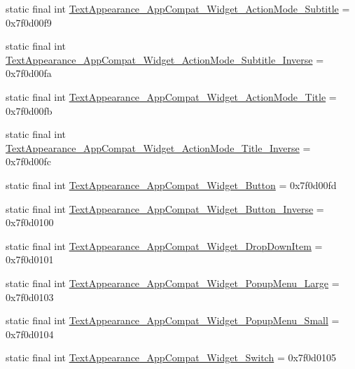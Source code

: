 \begin{DoxyCompactItemize}
static final int \mbox{\hyperlink{classcom_1_1google_1_1android_1_1gms_1_1R_1_1style_a1d243a24edebe60f77d75158e115153e}{Text\+Appearance\+\_\+\+App\+Compat\+\_\+\+Widget\+\_\+\+Action\+Mode\+\_\+\+Subtitle}} = 0x7f0d00f9
\item 
static final int \mbox{\hyperlink{classcom_1_1google_1_1android_1_1gms_1_1R_1_1style_ad203b7467b96ac78c8c6b61f2c54f6b7}{Text\+Appearance\+\_\+\+App\+Compat\+\_\+\+Widget\+\_\+\+Action\+Mode\+\_\+\+Subtitle\+\_\+\+Inverse}} = 0x7f0d00fa
\item 
static final int \mbox{\hyperlink{classcom_1_1google_1_1android_1_1gms_1_1R_1_1style_ad1125fe97c001a2f845969217abfa298}{Text\+Appearance\+\_\+\+App\+Compat\+\_\+\+Widget\+\_\+\+Action\+Mode\+\_\+\+Title}} = 0x7f0d00fb
\item 
static final int \mbox{\hyperlink{classcom_1_1google_1_1android_1_1gms_1_1R_1_1style_ad760836702bd5dc1630f2955991bf8eb}{Text\+Appearance\+\_\+\+App\+Compat\+\_\+\+Widget\+\_\+\+Action\+Mode\+\_\+\+Title\+\_\+\+Inverse}} = 0x7f0d00fc
\item 
static final int \mbox{\hyperlink{classcom_1_1google_1_1android_1_1gms_1_1R_1_1style_a27ea640eceee4202136b44b41c4dd060}{Text\+Appearance\+\_\+\+App\+Compat\+\_\+\+Widget\+\_\+\+Button}} = 0x7f0d00fd
\item 
static final int \mbox{\hyperlink{classcom_1_1google_1_1android_1_1gms_1_1R_1_1style_a10bcb1b8ccbdc284a51f921b1c25b1a8}{Text\+Appearance\+\_\+\+App\+Compat\+\_\+\+Widget\+\_\+\+Button\+\_\+\+Inverse}} = 0x7f0d0100
\item 
static final int \mbox{\hyperlink{classcom_1_1google_1_1android_1_1gms_1_1R_1_1style_a76db62b81a65e24f5f366c27a2a92e75}{Text\+Appearance\+\_\+\+App\+Compat\+\_\+\+Widget\+\_\+\+Drop\+Down\+Item}} = 0x7f0d0101
\item 
static final int \mbox{\hyperlink{classcom_1_1google_1_1android_1_1gms_1_1R_1_1style_a3b39e85003b05ff6ae5a8ee5169cfb30}{Text\+Appearance\+\_\+\+App\+Compat\+\_\+\+Widget\+\_\+\+Popup\+Menu\+\_\+\+Large}} = 0x7f0d0103
\item 
static final int \mbox{\hyperlink{classcom_1_1google_1_1android_1_1gms_1_1R_1_1style_a3b0f7aea844019689b64028465a35457}{Text\+Appearance\+\_\+\+App\+Compat\+\_\+\+Widget\+\_\+\+Popup\+Menu\+\_\+\+Small}} = 0x7f0d0104
\item 
static final int \mbox{\hyperlink{classcom_1_1google_1_1android_1_1gms_1_1R_1_1style_a4013616ac5bcc00ed7df24d7f461beba}{Text\+Appearance\+\_\+\+App\+Compat\+\_\+\+Widget\+\_\+\+Switch}} = 0x7f0d0105
\item 

\end{DoxyCompactItemize}
